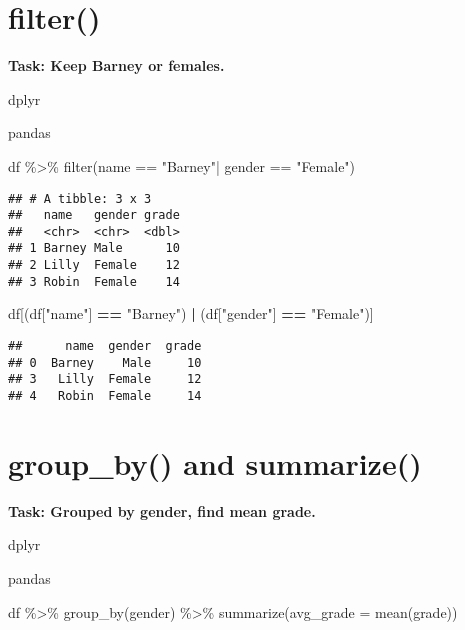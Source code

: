 \documentclass[
]{book}
\newenvironment{Shaded}{\begin{snugshade}}{\end{snugshade}}
\newcommand{\AttributeTok}[1]{\textcolor[rgb]{0.77,0.63,0.00}{#1}}
\newcommand{\FunctionTok}[1]{\textcolor[rgb]{0.00,0.00,0.00}{#1}}
\newcommand{\NormalTok}[1]{#1}
\newcommand{\OperatorTok}[1]{\textcolor[rgb]{0.81,0.36,0.00}{\textbf{#1}}}
\newcommand{\SpecialCharTok}[1]{\textcolor[rgb]{0.00,0.00,0.00}{#1}}
\newcommand{\StringTok}[1]{\textcolor[rgb]{0.31,0.60,0.02}{#1}}
\begin{document}
\hypertarget{filter}{%
\section{filter()}\label{filter}}

{\textbf{Task: Keep Barney or females.
}}

dplyr

pandas

\begin{Shaded}
\begin{Highlighting}[]
\NormalTok{df }\SpecialCharTok{\%\textgreater{}\%} 
  \FunctionTok{filter}\NormalTok{(name }\SpecialCharTok{==} \StringTok{"Barney"}\SpecialCharTok{|}\NormalTok{ gender }\SpecialCharTok{==} \StringTok{"Female"}\NormalTok{)}
\end{Highlighting}
\end{Shaded}

\begin{verbatim}
## # A tibble: 3 x 3
##   name   gender grade
##   <chr>  <chr>  <dbl>
## 1 Barney Male      10
## 2 Lilly  Female    12
## 3 Robin  Female    14
\end{verbatim}

\begin{Shaded}
\begin{Highlighting}[]
\NormalTok{df[(df[}\StringTok{"name"}\NormalTok{] }\OperatorTok{==} \StringTok{"Barney"}\NormalTok{) }\OperatorTok{|} 
\NormalTok{   (df[}\StringTok{"gender"}\NormalTok{] }\OperatorTok{==} \StringTok{"Female"}\NormalTok{)]}
\end{Highlighting}
\end{Shaded}

\begin{verbatim}
##      name  gender  grade
## 0  Barney    Male     10
## 3   Lilly  Female     12
## 4   Robin  Female     14
\end{verbatim}

\hypertarget{group_by-and-summarize}{%
\section{group\_by() and summarize()}\label{group_by-and-summarize}}

{\textbf{Task: Grouped by gender, find mean grade.
}}

dplyr

pandas

\begin{Shaded}
\begin{Highlighting}[]
\NormalTok{df }\SpecialCharTok{\%\textgreater{}\%} 
  \FunctionTok{group\_by}\NormalTok{(gender) }\SpecialCharTok{\%\textgreater{}\%} 
  \FunctionTok{summarize}\NormalTok{(}\AttributeTok{avg\_grade =} \FunctionTok{mean}\NormalTok{(grade))}
\end{Highlighting}
\end{Shaded}
\end{document}
